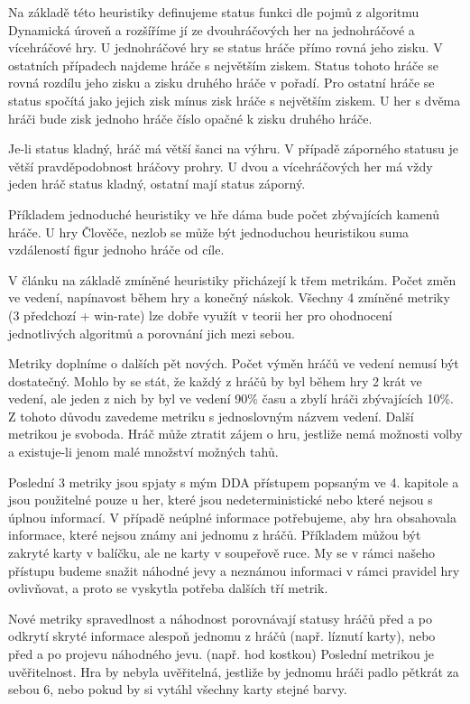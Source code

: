 Na základě této heuristiky definujeme status funkci dle pojmů z algoritmu Dynamická úroveň a rozšíříme jí ze dvouhráčových her na jednohráčové a vícehráčové hry. U jednohráčové hry se status hráče přímo rovná jeho zisku. V ostatních případech najdeme hráče s největším ziskem. Status tohoto hráče se rovná rozdílu jeho zisku a zisku druhého hráče v pořadí. Pro ostatní hráče se status spočítá jako jejich zisk mínus zisk hráče s největším ziskem. U her s dvěma hráči bude zisk jednoho hráče číslo opačné k zisku druhého hráče.

Je-li status kladný, hráč má větší šanci na výhru. V případě záporného statusu je větší pravděpodobnost hráčovy prohry. U dvou a vícehráčových her má vždy jeden hráč status kladný, ostatní mají status záporný.

Příkladem jednoduché heuristiky ve hře dáma bude počet zbývajících kamenů hráče. U hry Člověče, nezlob se může být jednoduchou heuristikou suma vzdáleností figur jednoho hráče od cíle.
 
V článku \cite{24DynLev} na základě zmíněné heuristiky přicházejí k třem metrikám. Počet změn ve vedení, napínavost během hry a konečný náskok. Všechny 4 zmíněné metriky (3 předchozí + win-rate) lze dobře využít v teorii her pro ohodnocení jednotlivých algoritmů a porovnání jich mezi sebou. 

Metriky doplníme o dalších pět nových. Počet výměn hráčů ve vedení nemusí být dostatečný. Mohlo by se stát, že každý z hráčů by byl během hry 2 krát ve vedení, ale jeden z nich by byl ve vedení 90\% času a zbylí hráči zbývajících 10\%. Z tohoto důvodu zavedeme metriku s jednoslovným názvem vedení. Další metrikou je svoboda. Hráč může ztratit zájem o hru, jestliže nemá možnosti volby a existuje-li jenom malé množství možných tahů.

Poslední 3 metriky jsou spjaty s mým DDA přístupem popsaným ve 4. kapitole a jsou použitelné pouze u her, které jsou nedeterministické nebo které nejsou s úplnou informací. V případě neúplné informace potřebujeme, aby hra obsahovala informace, které nejsou známy ani jednomu z hráčů. Příkladem můžou být zakryté karty v balíčku, ale ne karty v soupeřově ruce. My se v rámci našeho přístupu budeme snažit náhodné jevy a neznámou informaci v rámci pravidel hry ovlivňovat, a proto se vyskytla potřeba dalších tří metrik.

Nové metriky spravedlnost a náhodnost porovnávají statusy hráčů před a po odkrytí skryté informace alespoň jednomu z hráčů (např. líznutí karty), nebo před a po projevu náhodného jevu. (např. hod kostkou) Poslední metrikou je uvěřitelnost. Hra by nebyla uvěřitelná, jestliže by jednomu hráči padlo pětkrát za sebou 6, nebo pokud by si vytáhl všechny karty stejné barvy. 

